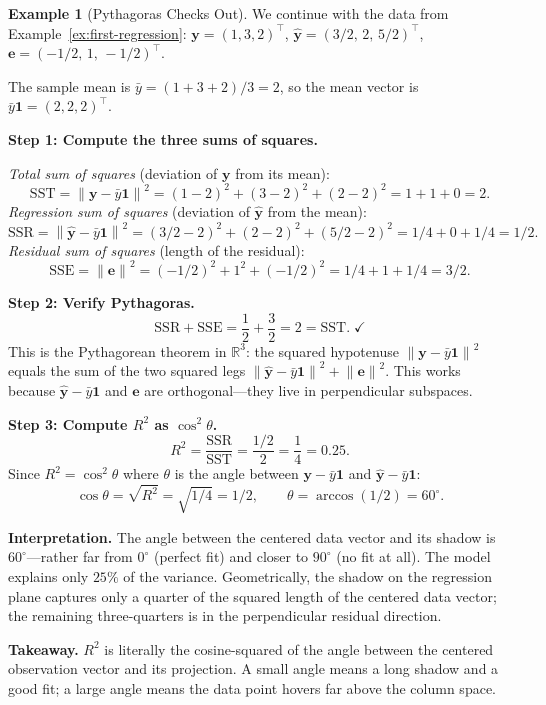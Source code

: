 \documentclass[11pt,a4paper]{article}
\theoremstyle{plain}
\theoremstyle{definition}
\newtheorem{example}[theorem]{Example}
\newcommand{\R}{\mathbb{R}}
\newcommand{\yhat}{\hat{\bm{y}}}
\newcommand{\by}{\bm{y}}
\newcommand{\be}{\bm{e}}
\newcommand{\norm}[1]{\left\lVert #1 \right\rVert}
\begin{document}
\begin{example}[Pythagoras Checks Out]\label{ex:pythagoras}
We continue with the data from Example~\ref{ex:first-regression}:
$\by = (1,3,2)^\top$, $\yhat = (3/2,\, 2,\, 5/2)^\top$,
$\be = (-1/2,\, 1,\, -1/2)^\top$.

The sample mean is $\bar{y} = (1+3+2)/3 = 2$, so the mean vector is
$\bar{y}\bm{1} = (2, 2, 2)^\top$.

\medskip\noindent\textbf{Step 1: Compute the three sums of squares.}

\emph{Total sum of squares} (deviation of $\by$ from its mean):
\[
\text{SST} = \norm{\by - \bar{y}\bm{1}}^2
= (1-2)^2 + (3-2)^2 + (2-2)^2
= 1 + 1 + 0 = 2.
\]
\emph{Regression sum of squares} (deviation of $\yhat$ from the mean):
\[
\text{SSR} = \norm{\yhat - \bar{y}\bm{1}}^2
= (3/2-2)^2 + (2-2)^2 + (5/2-2)^2
= 1/4 + 0 + 1/4 = 1/2.
\]
\emph{Residual sum of squares} (length of the residual):
\[
\text{SSE} = \norm{\be}^2
= (-1/2)^2 + 1^2 + (-1/2)^2
= 1/4 + 1 + 1/4 = 3/2.
\]

\medskip\noindent\textbf{Step 2: Verify Pythagoras.}
\[
\text{SSR} + \text{SSE} = \frac{1}{2} + \frac{3}{2} = 2 = \text{SST}.\;\checkmark
\]
This is the Pythagorean theorem in $\R^3$:
the squared hypotenuse $\norm{\by - \bar{y}\bm{1}}^2$ equals the sum of the two squared legs
$\norm{\yhat - \bar{y}\bm{1}}^2 + \norm{\be}^2$.
This works because $\yhat - \bar{y}\bm{1}$ and $\be$ are orthogonal---they live in perpendicular subspaces.

\medskip\noindent\textbf{Step 3: Compute $R^2$ as $\cos^2\theta$.}
\[
R^2 = \frac{\text{SSR}}{\text{SST}} = \frac{1/2}{2} = \frac{1}{4} = 0.25.
\]
Since $R^2 = \cos^2\theta$ where $\theta$ is the angle between
$\by - \bar{y}\bm{1}$ and $\yhat - \bar{y}\bm{1}$:
\[
\cos\theta = \sqrt{R^2} = \sqrt{1/4} = 1/2,
\qquad
\theta = \arccos(1/2) = 60^\circ.
\]

\medskip\noindent\textbf{Interpretation.}
The angle between the centered data vector and its shadow
is $60^\circ$---rather far from $0^\circ$ (perfect fit) and closer to $90^\circ$ (no fit at all).
The model explains only $25\%$ of the variance.
Geometrically, the shadow on the regression plane captures only
a quarter of the squared length of the centered data vector;
the remaining three-quarters is in the perpendicular residual direction.

\medskip\noindent\textbf{Takeaway.}
$R^2$ is literally the cosine-squared of the angle between the centered
observation vector and its projection.
A small angle means a long shadow and a good fit;
a large angle means the data point hovers far above the column space.
\end{example}
\end{document}
